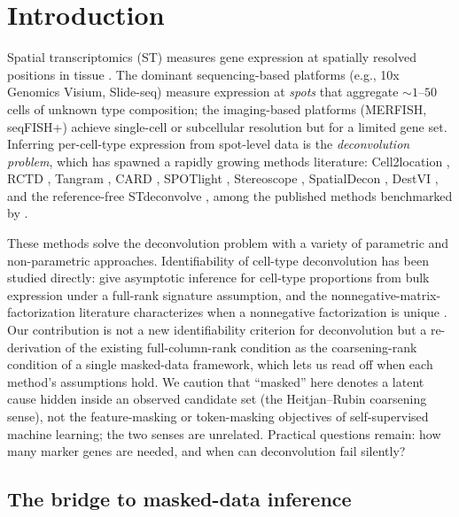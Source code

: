 \section{Introduction}
\label{sec:intro}

Spatial transcriptomics (ST) measures gene expression at spatially
resolved positions in tissue \citep{stahl2016visualization,
chen2015spatially,wang2018three}. The dominant sequencing-based
platforms (e.g., 10x Genomics Visium, Slide-seq) measure expression
at \emph{spots} that aggregate $\sim 1$--$50$ cells of unknown type
composition; the imaging-based platforms (MERFISH, seqFISH+) achieve
single-cell or subcellular resolution but for a limited gene set.
Inferring per-cell-type expression from spot-level data is the
\emph{deconvolution problem}, which has spawned a rapidly growing
methods literature: Cell2location \citep{kleshchevnikov2022cell2location},
RCTD \citep{cable2021robust}, Tangram \citep{biancalani2021deep},
CARD \citep{ma2022spatially}, SPOTlight \citep{elosua2021spotlight},
Stereoscope \citep{andersson2020stereoscope},
SpatialDecon \citep{danaher2022advances},
DestVI \citep{lopez2022destvi},
and the reference-free STdeconvolve \citep{miller2022reference},
among the published methods benchmarked by \citet{li2023comprehensive}.

These methods solve the deconvolution problem with a variety of
parametric and non-parametric approaches. Identifiability of
cell-type deconvolution has been studied directly: \citet{cai2024inference}
give asymptotic inference for cell-type proportions from bulk
expression under a full-rank signature assumption, and the
nonnegative-matrix-factorization literature characterizes when a
nonnegative factorization is unique \citep{donoho2003nmf,fu2019nmf}.
Our contribution is not a new identifiability criterion for
deconvolution but a re-derivation of the existing full-column-rank
condition as the coarsening-rank condition of a single masked-data
framework, which lets us read off when each method's assumptions hold.
We caution that ``masked'' here denotes a latent cause hidden inside an
observed candidate set (the Heitjan--Rubin coarsening sense), not the
feature-masking or token-masking objectives of self-supervised machine
learning; the two senses are unrelated. Practical questions remain:
how many marker genes are needed, and when can deconvolution fail
silently?

\subsection{The bridge to masked-data inference}

